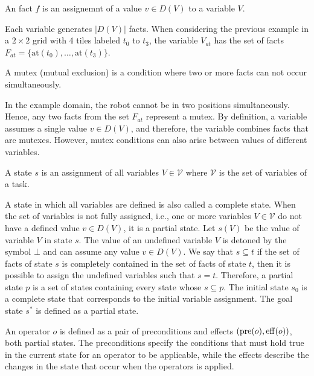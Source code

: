 \begin{definition}[Fact]\label{def:fact}
    An fact $f$ is an assignemnt of a value $v \in D(V)$ to a variable $V$.
\end{definition}

Each variable generates $|D(V)|$ facts. When considering the previous example in a $2 \times 2$ grid with 4 tiles labeled $t_0$ to $t_3$, the variable $V_{at}$ has the set of facts $F_{at}=\{\text{at}(t_0),\ldots,\text{at}(t_3)\}$.

\begin{definition}[Mutex]\label{def:mutex}
    A mutex (mutual exclusion) is a condition where two or more facts can not occur simultaneously.
\end{definition}

In the example domain, the robot cannot be in two positions simultaneously. Hence, any two facts from the set $F_{at}$ represent a mutex. By definition, a variable assumes a single value $v \in D(V)$, and therefore, the variable combines facts that are mutexes. However, mutex conditions can also arise between values of different variables.

\begin{definition}[State]\label{def:state}
    A state $s$ is an assignment of all variables $V \in \mathcal{V}$ where $\mathcal{V}$ is the set of variables of a task.
\end{definition}

A state in which all variables are defined is also called a complete state. When the set of variables is not fully assigned, i.e., one or more variables $V \in \mathcal{V}$ do not have a defined value $v \in D(V)$, it is a partial state. Let $s(V)$ be the value of variable $V$ in state $s$. The value of an undefined variable $V$ is detoned by the symbol $\bot$ and can assume any value $v \in D(V)$. We say that $s \subseteq t$ if the set of facts of state $s$ is completely contained in the set of facts of state $t$, then it is possible to assign the undefined variables such that $s = t$. Therefore, a partial state $p$ is a set of states containing every state whose $s \subseteq p$. The initial state $s_0$ is a complete state that corresponds to the initial variable assignment. The goal state $s^*$ is defined as a partial state.

\begin{definition}[Operator]\label{def:operator}
    An operator $o$ is defined as a pair of preconditions and effects $(\operatorname{pre}(o),\operatorname{eff}(o))$, both partial states. The preconditions specify the conditions that must hold true in the current state for an operator to be applicable, while the effects describe the changes in the state that occur when the operators is applied.
\end{definition}

